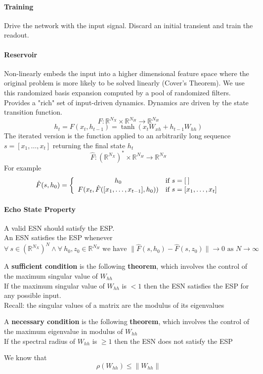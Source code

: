 \documentclass[10pt]{report}
\begin{document}
\paragraph{Training} Drive the network with the input signal. Discard an initial transient and train the readout.
\paragraph{Reservoir} Non-linearly embeds the input into a higher dimensional feature space where the original problem is more likely to be solved linearly (Cover's Theorem). We use this randomized basis expansion computed by a pool of randomized filters. Provides a "rich" set of input-driven dynamics. Dynamics are driven by the state transition function.
$$F:\mathbb{R}^{N_X}\times \mathbb{R}^{N_H}\rightarrow \mathbb{R}^{N_H}$$
$$h_t = F(x_t, h_{t-1}) = \tanh(x_tW_{xh} + h_{t-1}W_{hh})$$
The iterated version is the function applied to an arbitrarily long sequence $s = [x_1,\ldots,x_t]$ returning the final state $h_t$
$$\hat{F}:(\mathbb{R}^{N_X})^*\times \mathbb{R}^{N_H}\rightarrow \mathbb{R}^{N_H}$$
For example $$\hat{F}(s,h_0)=\left\{\begin{array}{c l}
h_0&\text{if }s=[\:]\\
F(x_t,\hat{F}([x_1,\ldots,x_{t-1}],h_0))&\text{if }s=[x_1,\ldots,x_t]
\end{array}\right.$$
\paragraph{Echo State Property} A valid ESN should satisfy the ESP.\\
An ESN satisfies the ESP whenever
$$\forall\:s\in (\mathbb{R}^{N_X})^N \wedge \forall\:h_0,z_0\in\mathbb{R}^{N_H}\text{ we have }\|\hat{F}(s, h_0)-\hat{F}(s,z_0)\|\rightarrow 0\text{ as }N\rightarrow\infty$$
\begin{list}{}{}
	\item A \textbf{sufficient condition} is the following \textbf{theorem}, which involves the control of the maximum singular value of $W_{hh}$\\
	If the maximum singular value of $W_{hh}$ is $< 1$ then the ESN satisfies the ESP for any possible input.\\
	Recall: the singular values of a matrix are the modulus of its eigenvalues
	\item A \textbf{necessary condition} is the following \textbf{theorem}, which involves the control of the maximum eigenvalue in modulus of $W_{hh}$\\
	If the spectral radius of $W_{hh}$ is $\geq 1$ then the ESN does not satisfy the ESP
\end{list}
We know that $$\rho(W_{hh})\leq \|W_{hh}\|$$
\end{document}
